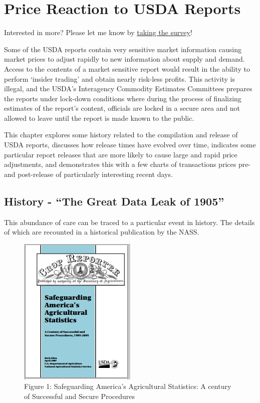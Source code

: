 \documentclass[
  letterpaper,
  DIV=11,
  numbers=noendperiod]{scrreprt}
\begin{document}

\hypertarget{price-reaction-to-usda-reports-1}{%
\chapter{Price Reaction to USDA
Reports}\label{price-reaction-to-usda-reports-1}}

{Interested in more? Please let me know by}
\href{https://forms.gle/Q3VByCQZHjfQSy9D7}{taking the survey}!

Some of the USDA reports contain very sensitive market information
causing market prices to adjust rapidly to new information about supply
and demand. Access to the contents of a market sensitive report would
result in the ability to perform `insider trading' and obtain nearly
risk-less profits. This activity is illegal, and the USDA's Interagency
Commodity Estimates Committees prepares the reports under lock-down
conditions where during the process of finalizing estimates of the
report's content, officials are locked in a secure area and not allowed
to leave until the report is made known to the public.

This chapter explores some history related to the compilation and
release of USDA reports, discusses how release times have evolved over
time, indicates some particular report releases that are more likely to
cause large and rapid price adjustments, and demonstrates this with a
few charts of transactions prices pre- and post-release of particularly
interesting recent days.

\hypertarget{history---the-great-data-leak-of-1905-1}{%
\section{History - ``The Great Data Leak of
1905''}\label{history---the-great-data-leak-of-1905-1}}

This abundance of care can be traced to a particular event in history.
The details of which are recounted in a historical publication by the
NASS.

\begin{figure}

{\centering \includegraphics{images/NASS_History.png}

}

\caption{Figure 1: Safeguarding America's Agricultural Statistics: A
century of Successful and Secure Procedures}

\end{figure}
\end{document}
